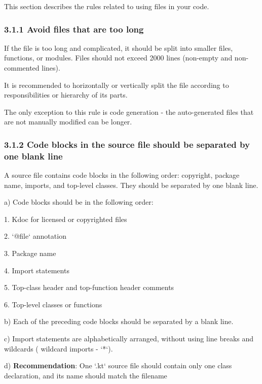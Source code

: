 This section describes the rules related to using files in your code.

\subsubsection*{\textbf{3.1.1 Avoid files that are too long}}
\leavevmode\newline



If the file is too long and complicated, it should be split into smaller files, functions, or modules. Files should not exceed 2000 lines (non-empty and non-commented lines).

It is recommended to horizontally or vertically split the file according to responsibilities or hierarchy of its parts.

The only exception to this rule is code generation - the auto-generated files that are not manually modified can be longer.



\subsubsection*{\textbf{3.1.2 Code blocks in the source file should be separated by one blank line}}
\leavevmode\newline

A source file contains code blocks in the following order: copyright, package name, imports, and top-level classes. They should be separated by one blank line.



a) Code blocks should be in the following order:

1.	Kdoc for licensed or copyrighted files

2.	`@file` annotation

3.	Package name

4.	Import statements

5.	Top-class header and top-function header comments

6.	Top-level classes or functions



b) Each of the preceding code blocks should be separated by a blank line. 



c) Import statements are alphabetically arranged, without using line breaks and wildcards ( wildcard imports - `*`). 



d) \textbf{Recommendation}: One `.kt` source file should contain only one class declaration, and its name should match the filename



